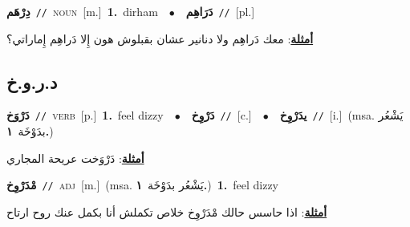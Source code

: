 \documentclass[10pt,a4paper,twoside]{article} %
\begin{document}
\begin{multicols}{2}
{\setlength\topsep{0pt}\textbf{\foreignlanguage{arabic}{دِرْهَم}}\ {\color{gray}\texttt{//}\color{black}}\ \textsc{noun}\ [m.]\ \textbf{1.}~dirham\ \ $\bullet$\ \ \setlength\topsep{0pt}\textbf{\foreignlanguage{arabic}{دَرَاهِم}}\ {\color{gray}\texttt{//}\color{black}}\ [pl.]\  \begin{flushright}\color{gray}\foreignlanguage{arabic}{\textbf{\underline{\foreignlanguage{arabic}{أمثلة}}}: معك دَراهِم ولا دنانير عشان بقبلوش هون إِلا دَراهِم إِماراتي؟}\end{flushright}\color{black}} \vspace{2mm}

\vspace{-3mm}
\subsection*{\color{blue}\foreignlanguage{arabic}{د.ر.و.خ}\color{blue}{}} 

{\setlength\topsep{0pt}\textbf{\foreignlanguage{arabic}{دَرْوَخ}}\ {\color{gray}\texttt{//}\color{black}}\ \textsc{verb}\ [p.]\ \textbf{1.}~feel dizzy\ \ $\bullet$\ \ \setlength\topsep{0pt}\textbf{\foreignlanguage{arabic}{دَرْوِخ}}\ {\color{gray}\texttt{//}\color{black}}\ [c.]\ \ $\bullet$\ \ \setlength\topsep{0pt}\textbf{\foreignlanguage{arabic}{يدَرْوِخ}}\ {\color{gray}\texttt{//}\color{black}}\ [i.]\ \color{gray}(msa. \foreignlanguage{arabic}{يَشْعُر بدَوْخَة}~\foreignlanguage{arabic}{\textbf{١.}})\color{black}\  \begin{flushright}\color{gray}\foreignlanguage{arabic}{\textbf{\underline{\foreignlanguage{arabic}{أمثلة}}}: دَرْوَخت عريحة المجاري}\end{flushright}\color{black}} \vspace{2mm}

{\setlength\topsep{0pt}\textbf{\foreignlanguage{arabic}{مْدَرْوِخ}}\ {\color{gray}\texttt{//}\color{black}}\ \textsc{adj}\ [m.]\ \color{gray}(msa. \foreignlanguage{arabic}{يَشْعُر بدَوْخَة}~\foreignlanguage{arabic}{\textbf{١.}})\color{black}\ \textbf{1.}~feel dizzy\  \begin{flushright}\color{gray}\foreignlanguage{arabic}{\textbf{\underline{\foreignlanguage{arabic}{أمثلة}}}: اذا حاسس حالك مْدَرْوِخ خلاص تكملش أنا بكمل عنك روح ارتاح}\end{flushright}\color{black}} \vspace{2mm}


\end{multicols}
\end{document}
